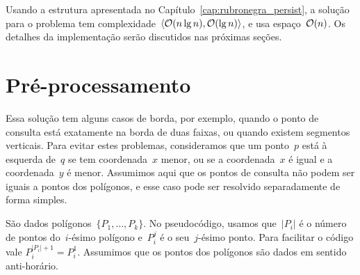 \documentclass[main.tex]{subfiles}
\begin{document}
Usando a estrutura apresentada no Capítulo~\ref{cap:rubronegra_persist}, a solução para o problema tem complexidade~$\langle\mathcal{O}(n \lg n), \mathcal{O}(\lg n)\rangle$, e usa espaço~$\mathcal{O}(n)$. Os detalhes da implementação serão discutidos nas próximas seções.


\section{Pré-processamento}

Essa solução tem alguns casos de borda, por exemplo, quando o ponto de consulta está exatamente na borda de duas faixas, ou quando existem segmentos verticais. Para evitar estes problemas, consideramos que um ponto~$p$ está à esquerda de~$q$ se tem coordenada~$x$ menor, ou se a coordenada~$x$ é igual e a coordenada~$y$ é menor. Assumimos aqui que os pontos de consulta não podem ser iguais a pontos dos polígonos, e esse caso pode ser resolvido separadamente de forma simples.

\providecommand{\from}{\V{from}}
\providecommand{\tto}{\V{to}}
\providecommand{\topp}{\V{top}}
\providecommand{\seg}{\V{seg}}
\providecommand{\add}{\V{add}}
\providecommand{\events}{\V{events}}
\providecommand{\rbt}{\V{rbt}}
\providecommand{\slabs}{\V{slabs}}
\providecommand{\current}{\V{current}}
\providecommand{\polygon}{\V{polygon}}

São dados polígonos~$\{P_1, \ldots, P_k\}$. No pseudocódigo, usamos que~$|P_i|$ é o número de pontos do~\mbox{$i$-ésimo} polígono e~$P_i^j$ é o seu~$j$-ésimo ponto. Para facilitar o código vale ${P_i^{|P_i|+1} = P_i^1}$. Assumimos que os pontos dos polígonos são dados em sentido anti-horário.
\end{document}
